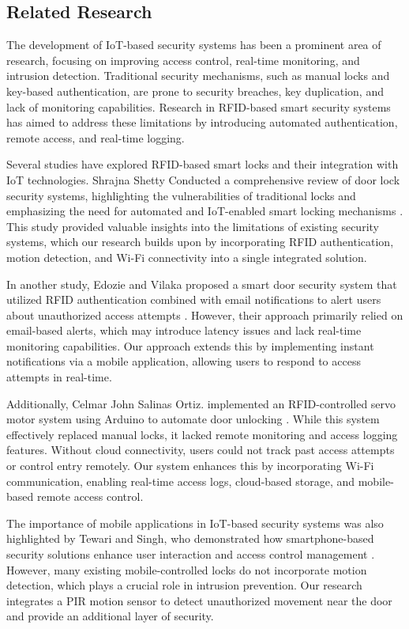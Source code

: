 \documentclass[a4paper]{scrartcl}
\begin{document}
\subsection{Related Research}
The development of IoT-based security systems has been a prominent area of research, focusing on improving access control, real-time monitoring, and intrusion detection. Traditional security mechanisms, such as manual locks and key-based authentication, are prone to security breaches, key duplication, and lack of monitoring capabilities. Research in RFID-based smart security systems has aimed to address these limitations by introducing automated authentication, remote access, and real-time logging.

Several studies have explored RFID-based smart locks and their integration with IoT technologies. Shrajna Shetty Conducted a comprehensive review of door lock security systems, highlighting the vulnerabilities of traditional locks and emphasizing the need for automated and IoT-enabled smart locking mechanisms \cite{Shetty2020}. This study provided valuable insights into the limitations of existing security systems, which our research builds upon by incorporating RFID authentication, motion detection, and Wi-Fi connectivity into a single integrated solution.

In another study, Edozie and Vilaka proposed a smart door security system that utilized RFID authentication combined with email notifications to alert users about unauthorized access attempts \cite{Edozie2020}. However, their approach primarily relied on email-based alerts, which may introduce latency issues and lack real-time monitoring capabilities. Our approach extends this by implementing instant notifications via a mobile application, allowing users to respond to access attempts in real-time.

Additionally, Celmar John Salinas Ortiz. implemented an RFID-controlled servo motor system using Arduino to automate door unlocking \cite{Ortiz2021}. While this system effectively replaced manual locks, it lacked remote monitoring and access logging features. Without cloud connectivity, users could not track past access attempts or control entry remotely. Our system enhances this by incorporating Wi-Fi communication, enabling real-time access logs, cloud-based storage, and mobile-based remote access control.

The importance of mobile applications in IoT-based security systems was also highlighted by Tewari and Singh, who demonstrated how smartphone-based security solutions enhance user interaction and access control management \cite{Tewari2021}. However, many existing mobile-controlled locks do not incorporate motion detection, which plays a crucial role in intrusion prevention. Our research integrates a PIR motion sensor to detect unauthorized movement near the door and provide an additional layer of security.
\end{document}
